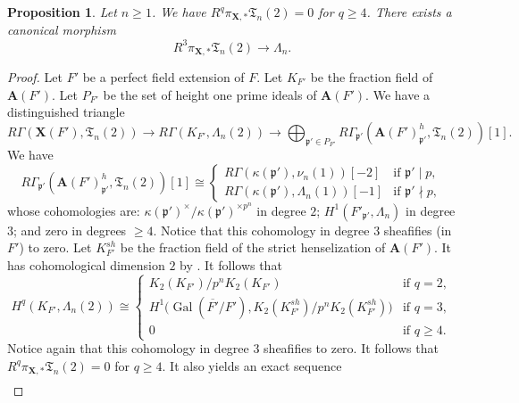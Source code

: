 \documentclass{amsart}
\newtheorem{Prop}[Thm]{Proposition}
\theoremstyle{remark}
\numberwithin{equation}{subsection}
\newcommand{\closure}[1]{\overline{#1}}
\newcommand{\alg}[1]{\mathbf{#1}}
\newcommand{\ideal}[1]{\mathfrak{#1}}
\DeclareMathOperator{\Gal}{Gal}
\begin{document}
\begin{Prop} \label{0111}
	Let $n \ge 1$.
	We have $R^{q} \pi_{\alg{X}, \ast} \mathfrak{T}_{n}(2) = 0$ for $q \ge 4$.
	There exists a canonical morphism
		\begin{equation} \label{0498}
				R^{3} \pi_{\alg{X}, \ast} \mathfrak{T}_{n}(2)
			\to
				\Lambda_{n}.
		\end{equation}
\end{Prop}

\begin{proof}
	Let $F'$ be a perfect field extension of $F$.
	Let $K_{F'}$ be the fraction field of $\alg{A}(F')$.
	Let $P_{F'}$ be the set of height one prime ideals of $\alg{A}(F')$.
	We have a distinguished triangle
		\[
				R \Gamma(\alg{X}(F'), \mathfrak{T}_{n}(2))
			\to
				R \Gamma(K_{F'}, \Lambda_{n}(2))
			\to
				\bigoplus_{\ideal{p}' \in P_{F'}}
					R \Gamma_{\ideal{p}'}(\alg{A}(F')_{\ideal{p}'}^{h}, \mathfrak{T}_{n}(2))[1].
		\]
	We have
		\[
				R \Gamma_{\ideal{p}'}(\alg{A}(F')_{\ideal{p}'}^{h}, \mathfrak{T}_{n}(2))[1]
			\cong
				\begin{cases}
						R \Gamma(\kappa(\ideal{p}'), \nu_{n}(1))[-2]
					&	\text{if }
						\ideal{p}' \mid p,
					\\
						R \Gamma(\kappa(\ideal{p}'), \Lambda_{n}(1))[-1]
					&	\text{if }
						\ideal{p}' \nmid p,
				\end{cases}
		\]
	whose cohomologies are:
	$\kappa(\ideal{p}')^{\times} / \kappa(\ideal{p}')^{\times p^{n}}$
	in degree $2$;
	$H^{1}(F'_{\ideal{p}'}, \Lambda_{n})$ in degree $3$;
	and zero in degrees $\ge 4$.
	Notice that this cohomology in degree $3$ sheafifies (in $F'$) to zero.
	Let $K_{F'}^{sh}$ be the fraction field of the strict henselization of $\alg{A}(F')$.
	It has cohomological dimension $2$ by \cite[Theorem (5.1)]{Sai86}.
	It follows that
		\[
				H^{q}(K_{F'}, \Lambda_{n}(2))
			\cong
				\begin{cases}
						K_{2}(K_{F'}) / p^{n} K_{2}(K_{F'})
					&	\text{if }
						q = 2,
					\\
						H^{1} \bigl(
							\Gal(\closure{F'} / F'),
							K_{2}(K_{F'}^{sh}) / p^{n} K_{2}(K_{F'}^{sh})
						\bigr)
					&	\text{if }
						q = 3,
					\\
						0
					&	\text{if }
						q \ge 4.
				\end{cases}
		\]
	Notice again that this cohomology in degree $3$ sheafifies to zero.
	It follows that
	$R^{q} \pi_{\alg{X}, \ast} \mathfrak{T}_{n}(2) = 0$ for $q \ge 4$.
	It also yields an exact sequence
		\begin{align*}

\end{align*}
\end{proof}
\end{document}

